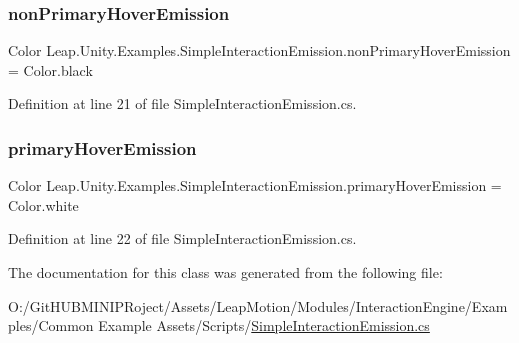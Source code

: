 \subsubsection{\texorpdfstring{nonPrimaryHoverEmission}{nonPrimaryHoverEmission}}
{\footnotesize\ttfamily Color Leap.\+Unity.\+Examples.\+Simple\+Interaction\+Emission.\+non\+Primary\+Hover\+Emission = Color.\+black}



Definition at line 21 of file Simple\+Interaction\+Emission.\+cs.

\mbox{\label{class_leap_1_1_unity_1_1_examples_1_1_simple_interaction_emission_acfeba38a462c1a9ae7900144acf08e29}} 
\subsubsection{\texorpdfstring{primaryHoverEmission}{primaryHoverEmission}}
{\footnotesize\ttfamily Color Leap.\+Unity.\+Examples.\+Simple\+Interaction\+Emission.\+primary\+Hover\+Emission = Color.\+white}



Definition at line 22 of file Simple\+Interaction\+Emission.\+cs.



The documentation for this class was generated from the following file\+:\begin{DoxyCompactItemize}
\item 
O\+:/\+Git\+H\+U\+B\+M\+I\+N\+I\+P\+Roject/\+Assets/\+Leap\+Motion/\+Modules/\+Interaction\+Engine/\+Examples/\+Common Example Assets/\+Scripts/\mbox{\hyperlink{_simple_interaction_emission_8cs}{Simple\+Interaction\+Emission.\+cs}}\end{DoxyCompactItemize}
